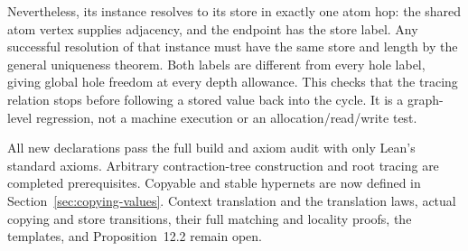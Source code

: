 

Nevertheless, its instance resolves to its store in exactly one atom hop:
the shared atom vertex supplies adjacency, and the endpoint has the store
label. Any successful resolution of that instance must have the same store
and length by the general uniqueness theorem. Both labels are different
from every hole label, giving global hole freedom at every depth allowance.
This checks that the tracing relation stops before following a stored value
back into the cycle. It is a graph-level regression, not a machine execution
or an allocation/read/write test.




All new declarations pass the full build and axiom audit with only Lean's
standard axioms. Arbitrary contraction-tree construction and root tracing
are completed prerequisites. Copyable and stable hypernets are now defined
in Section~\ref{sec:copying-values}. Context translation and the translation laws,
actual copying and store transitions, their full matching and
locality proofs, the templates, and Proposition~12.2 remain open.
